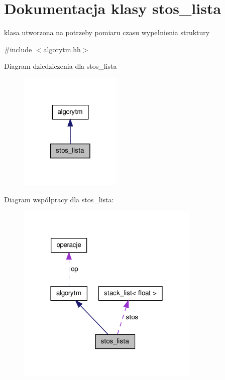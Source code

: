 \hypertarget{classstos__lista}{\section{\-Dokumentacja klasy stos\-\_\-lista}
\label{classstos__lista}
}


klasa utworzona na potrzeby pomiaru czasu wypełnienia struktury  




{\ttfamily \#include $<$algorytm.\-hh$>$}



\-Diagram dziedziczenia dla stos\-\_\-lista\nopagebreak
\begin{figure}[H]
\begin{center}
\leavevmode
\includegraphics[width=138pt]{classstos__lista__inherit__graph}
\end{center}
\end{figure}


\-Diagram współpracy dla stos\-\_\-lista\-:\nopagebreak
\begin{figure}[H]
\begin{center}
\leavevmode
\includegraphics[width=246pt]{classstos__lista__coll__graph}
\end{center}
\end{figure}
